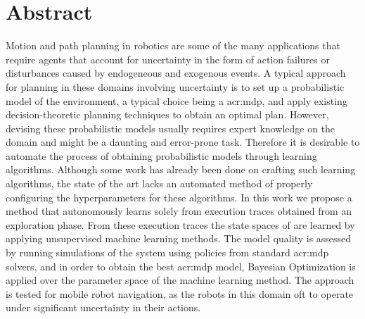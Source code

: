 \chapter*{Abstract}
\label{ch:abstract}

Motion and path planning in robotics are some of the many applications that require agents that account for uncertainty in the form of action failures or disturbances caused by endogeneous and exogenous events.
A typical approach for planning in these domains involving uncertainty is to set up a probabilistic model of the environment, a typical choice being a \acrfull{acr:mdp}, and apply existing decision-theoretic planning techniques to obtain an optimal plan.
However, devising these probabilistic models usually requires expert knowledge on the domain and might be a daunting and error-prone task.
Therefore it is desirable to automate the process of obtaining probabilistic models through learning algorithms.
Although some work has already been done on crafting such learning algorithms, the state of the art lacks an automated method of properly configuring the hyperparameters for these algorithms.
In this work we propose a method that autonomously learns  solely from execution traces obtained from an exploration phase.
From these execution traces the state spaces of  are learned by applying unsupervised machine learning methods.
The model quality is assessed by running simulations of the system using policies from standard \acrshort{acr:mdp} solvers, and in order to obtain the best \acrshort{acr:mdp} model, Bayesian Optimization is applied over the parameter space of the machine learning method.
The approach is tested for mobile robot navigation, as the robots in this domain oft to operate under significant uncertainty in their actions.

%
%

